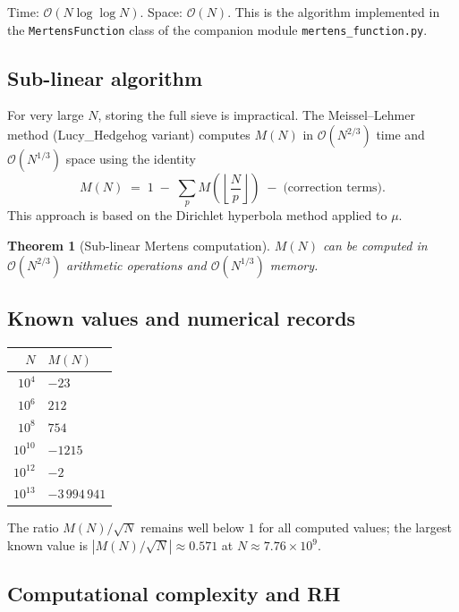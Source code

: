 \documentclass[12pt,a4paper]{amsart}
\newtheorem{theorem}{Theorem}[section]
\theoremstyle{definition}
\newcommand{\BigO}{\mathcal{O}}
\begin{document}
Time: $\BigO(N \log\log N)$.  Space: $\BigO(N)$.  This is the algorithm
implemented in the \texttt{MertensFunction} class of the companion module
\texttt{mertens\_function.py}.

\subsection{Sub-linear algorithm}

For very large $N$, storing the full sieve is impractical.  The
Meissel--Lehmer method (Lucy\_Hedgehog variant) computes $M(N)$ in
$\BigO(N^{2/3})$ time and $\BigO(N^{1/3})$ space using the identity
\[
  M(N) \;=\; 1 \;-\; \sum_p M\!\left(\left\lfloor\frac{N}{p}\right\rfloor\right)
            \;-\; \text{(correction terms)}.
\]
This approach is based on the Dirichlet hyperbola method applied to $\mu$.

\begin{theorem}[Sub-linear Mertens computation]
\label{thm:sublinear}
$M(N)$ can be computed in $\BigO(N^{2/3})$ arithmetic operations and
$\BigO(N^{1/3})$ memory.
\end{theorem}

\subsection{Known values and numerical records}

\begin{center}
\begin{tabular}{rl}
\toprule
$N$ & $M(N)$ \\
\midrule
$10^4$  & $-23$ \\
$10^6$  & $212$ \\
$10^8$  & $754$ \\
$10^{10}$ & $-1215$ \\
$10^{12}$ & $-2$\\
$10^{13}$ & $-3\,994\,941$ \\
\bottomrule
\end{tabular}
\end{center}

The ratio $M(N)/\sqrt{N}$ remains well below $1$ for all computed values;
the largest known value is $|M(N)/\sqrt{N}| \approx 0.571$ at
$N \approx 7.76 \times 10^9$.

\subsection{Computational complexity and RH}
\end{document}
